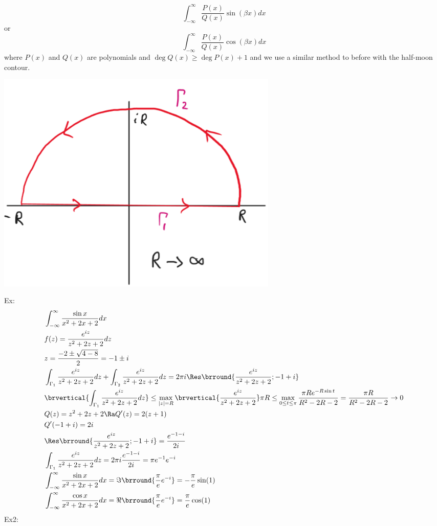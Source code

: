 \[\int_{-\infty}^\infty\frac{P(x)}{Q(x)}\sin(\beta x)dx\]
or
\[\int_{-\infty}^\infty\frac{P(x)}{Q(x)}\cos(\beta x)dx\]
where $P(x)$ and $Q(x)$ are polynomials and $\deg Q(x)\geq\deg P(x)+1$ and we use a similar method to before with the half-moon contour.\\
\centerline{\includegraphics[width=0.6\textwidth]{Images/ComplexAnalysisPictures/HalfMoon.png}}
Ex:
\begin{align*}
    &\int_{-\infty}^\infty\frac{\sin x}{x^2+2x+2}dx\\
    &f(z)=\frac{e^{iz}}{z^2+2z+2}dz\\
    &z=\frac{-2\pm\sqrt{4-8}}{2}=-1\pm i\\
    &\int_{\Gamma_1}\frac{e^{iz}}{z^2+2z+2}dz+\int_{\Gamma_2}\frac{e^{iz}}{z^2+2z+2}dz=2\pi i\Res\brround{\frac{e^{iz}}{z^2+2z+2};-1+i}\\
    &\brvertical{\int_{\Gamma_1}\frac{e^{iz}}{z^2+2z+2}dz}\leq\max_{|z|=R}\brvertical{\frac{e^{iz}}{z^2+2z+2}}\pi R\leq\max_{0\leq t\leq \pi}\frac{\pi Re^{-R\sin t}}{R^2-2R-2}=\frac{\pi R}{R^2-2R-2}\to 0\\
    &Q(z)=z^2+2z+2\Ra Q'(z)=2(z+1)\\
    &Q'(-1+ i)=2i\\
    &\Res\brround{\frac{e^{iz}}{z^2+2z+2};-1+ i}=\frac{e^{-1-i}}{2i}\\
    &\int_{\Gamma_1}\frac{e^{iz}}{z^2+2z+2}dz=2\pi i\frac{e^{-1-i}}{2i}=\pi e^{-1}e^{-i}\\
    &\int_{-\infty}^\infty\frac{\sin x}{x^2+2x+2}dx=\Im\brround{\frac{\pi}{e}e^{-i}}=-\frac{\pi}{e}\sin(1)\\
    &\int_{-\infty}^\infty\frac{\cos x}{x^2+2x+2}dx=\Re\brround{\frac{\pi}{e}e^{-i}}=\frac{\pi}{e}\cos(1)
\end{align*}
Ex2:
